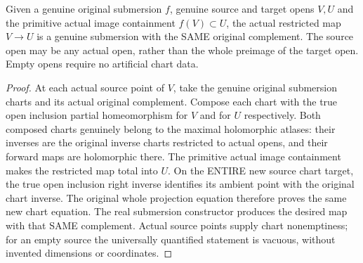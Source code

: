 \begin{theorem}
\label{hir:submersion-contact-parameters-actual-open-restriction}
\leanok
Given a genuine original submersion $f$, genuine source and target opens
$V,U$ and the primitive actual image containment $f(V)\subset U$, the
actual restricted map $V\to U$ is a genuine submersion with the SAME original
complement. The source open may be any actual open, rather than the whole
preimage of the target open. Empty opens require no artificial chart data.
\end{theorem}
\begin{proof}
At each actual source point of $V$, take the genuine original submersion
charts and its actual original complement. Compose each chart with the true
open inclusion partial homeomorphism for $V$ and for $U$ respectively.
Both composed charts genuinely belong to the maximal holomorphic atlases:
their inverses are the original inverse charts restricted to actual opens,
and their forward maps are holomorphic there. The primitive actual image
containment makes the restricted map total into $U$. On the ENTIRE new source
chart target, the true open inclusion right inverse identifies its ambient
point with the original chart inverse. The original whole projection equation
therefore proves the same new chart equation. The real submersion constructor
produces the desired map with that SAME complement. Actual source points
supply chart nonemptiness; for an empty source the universally quantified
statement is vacuous, without invented dimensions or coordinates.
\end{proof}

